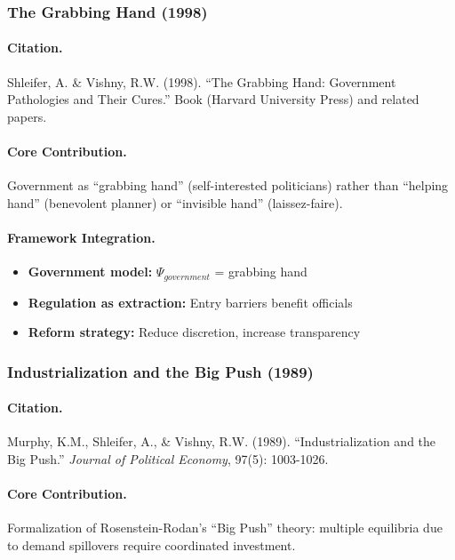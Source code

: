 \documentclass[12pt,a4paper]{article}
\begin{document}
\subsubsection{The Grabbing Hand (1998)}

\paragraph{Citation.}
Shleifer, A. \& Vishny, R.W. (1998).
``The Grabbing Hand: Government Pathologies and Their Cures.''
Book (Harvard University Press) and related papers.

\paragraph{Core Contribution.}
Government as ``grabbing hand'' (self-interested politicians) rather than
``helping hand'' (benevolent planner) or ``invisible hand'' (laissez-faire).

\paragraph{Framework Integration.}
\begin{itemize}
  \item \textbf{Government model:} $\Psi_{government}$ = grabbing hand
  \item \textbf{Regulation as extraction:} Entry barriers benefit officials
  \item \textbf{Reform strategy:} Reduce discretion, increase transparency
\end{itemize}

\subsubsection{Industrialization and the Big Push (1989)}

\paragraph{Citation.}
Murphy, K.M., Shleifer, A., \& Vishny, R.W. (1989).
``Industrialization and the Big Push.''
\emph{Journal of Political Economy}, 97(5): 1003-1026.

\paragraph{Core Contribution.}
Formalization of Rosenstein-Rodan's ``Big Push'' theory: multiple equilibria
due to demand spillovers require coordinated investment.
\end{document}
